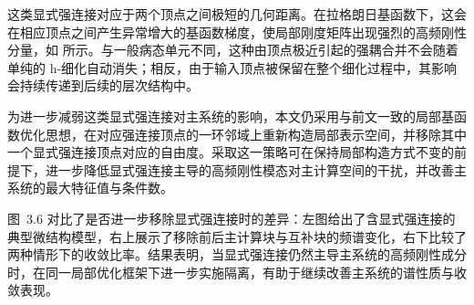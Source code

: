这类显式强连接对应于两个顶点之间极短的几何距离。在拉格朗日基函数下，这会在相应顶点之间产生异常增大的基函数梯度，使局部刚度矩阵出现强烈的高频刚性分量，如  所示。与一般病态单元不同，这种由顶点极近引起的强耦合并不会随着单纯的 h-细化自动消失；相反，由于输入顶点被保留在整个细化过程中，其影响会持续传递到后续的层次结构中。

为进一步减弱这类显式强连接对主系统的影响，本文仍采用与前文一致的局部基函数优化思想，在对应强连接顶点的一环邻域上重新构造局部表示空间，并移除其中一个显式强连接顶点对应的自由度。采取这一策略可在保持局部构造方式不变的前提下，进一步降低显式强连接主导的高频刚性模态对主计算空间的干扰，并改善主系统的最大特征值与条件数。

图~3.6 对比了是否进一步移除显式强连接时的差异：左图给出了含显式强连接的典型微结构模型，右上展示了移除前后主计算块与互补块的频谱变化，右下比较了两种情形下的收敛比率。结果表明，当显式强连接仍然主导主系统的高频刚性成分时，在同一局部优化框架下进一步实施隔离，有助于继续改善主系统的谱性质与收敛表现。
